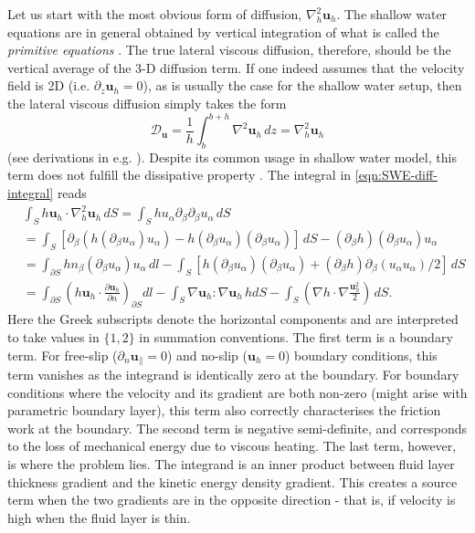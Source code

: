 Let us start with the most obvious form of diffusion, $\nabla_h^2 \mathbf{u}_h$.
The shallow water equations are in general obtained by vertical integration of what is called the \textit{primitive equations} \parencite{shchepetkin_physically_1996}. The true lateral viscous diffusion, therefore, should be the vertical average of the 3-D diffusion term. If one indeed assumes that the velocity field is 2D (i.e. $\partial_z \mathbf{u}_h = 0$), as is usually the case for the shallow water setup, then the lateral viscous diffusion simply takes the form
\begin{equation}\label{eqn:diff-visc-naive}
    \mathcal{D}_\mathbf{u} = \frac{1}{h} \int_{b}^{b+h} \nabla^2 \mathbf{u}_h \, dz = \nabla_h^2 \mathbf{u}_h
\end{equation}
(see derivations in e.g. \textcite{krylova_derivation_2017}). Despite its common usage in shallow water model, this term does not fulfill the dissipative property \parencite{gent_energetically_1993}. The integral in \ref{eqn:SWE-diff-integral} reads
\begin{equation}\label{eqn:diff-visc-naive-integral}
\begin{aligned}
    &\int_S h \mathbf{u}_h\cdot \nabla_h^2 \mathbf{u}_h \, dS = \int_S h u_\alpha \partial_\beta \partial_\beta u_\alpha \, dS \\
    &= \int_S \left[ \partial_\beta (h (\partial_\beta u_\alpha) u_\alpha) - h (\partial_\beta u_\alpha) (\partial_\beta u_\alpha) \right] \, dS - (\partial_\beta h) (\partial_\beta u_\alpha) u_\alpha \\ 
    &= \int_{\partial S} h n_\beta (\partial_\beta u_\alpha) u_\alpha \, dl - \int_S \left[h (\partial_\beta u_\alpha) (\partial_\beta u_\alpha) + (\partial_\beta h) \partial_\beta (u_\alpha u_\alpha)/2\right] \, dS \\
    &= \int_{\partial S} \left(h \mathbf{u}_h \cdot \frac{\partial \mathbf{u}_h}{\partial n}\right)_{\partial S} dl - \int_S \nabla \mathbf{u}_h : \nabla \mathbf{u}_h \, h dS - \int_S \left(\nabla h \cdot \nabla \frac{\mathbf{u}_h^2}{2}\right) \, dS.
\end{aligned}
\end{equation}
Here the Greek subscripts denote the horizontal components and are interpreted to take values in $\{1,2\}$ in summation conventions. The first term is a boundary term. For free-slip ($\partial_n \mathbf{u}_\parallel = 0$) and no-slip ($\mathbf{u}_h = 0$) boundary conditions, this term vanishes as the integrand is identically zero at the boundary. For boundary conditions where the velocity and its gradient are both non-zero (might arise with parametric boundary layer), this term also correctly characterises the friction work at the boundary. The second term is negative semi-definite, and corresponds to the loss of mechanical energy due to viscous heating. The last term, however, is where the problem lies. The integrand is an inner product between fluid layer thickness gradient and the kinetic energy density gradient. This creates a source term when the two gradients are in the opposite direction - that is, if velocity is high when the fluid layer is thin. 

